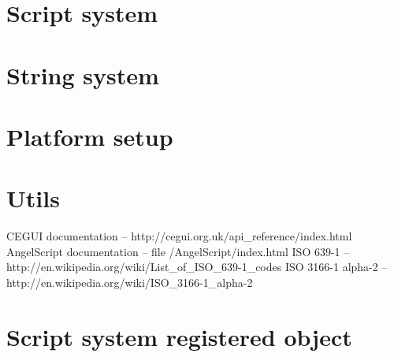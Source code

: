 \documentclass[a4paper, 12pt]{report}
\begin{document}
\chapter{Script system}



\chapter{String system}
\label{chap:string}



\chapter{Platform setup}



\chapter{Utils}
\label{chap:utils}





\begin{thebibliography}{9}
CEGUI documentation -- http://cegui.org.uk/api\_reference/index.html
AngelScript documentation -- file /AngelScript/index.html
ISO 639-1 -- http://en.wikipedia.org/wiki/List\_of\_ISO\_639-1\_codes
ISO 3166-1 alpha-2 -- http://en.wikipedia.org/wiki/ISO\_3166-1\_alpha-2
\end{thebibliography}



\clearpage
{}
\listoffigures

\clearpage
{}
\listoftables

\appendix

\chapter{Script system registered object}


\end{document}
